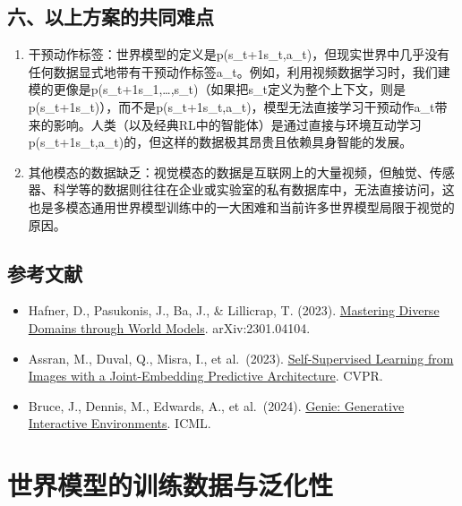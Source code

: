\hypertarget{ux516dux4ee5ux4e0aux65b9ux6848ux7684ux5171ux540cux96beux70b9}{%
\subsection{六、以上方案的共同难点}\label{ux516dux4ee5ux4e0aux65b9ux6848ux7684ux5171ux540cux96beux70b9}}

\begin{enumerate}
\def\labelenumi{\arabic{enumi}.}
\item
  干预动作标签：世界模型的定义是p(s\_t+1\textbar s\_t,a\_t)，但现实世界中几乎没有任何数据显式地带有干预动作标签a\_t。例如，利用视频数据学习时，我们建模的更像是p(s\_t+1\textbar s\_1,\ldots,s\_t)（如果把s\_t定义为整个上下文，则是p(s\_t+1\textbar s\_t)），而不是p(s\_t+1\textbar s\_t,a\_t)，模型无法直接学习干预动作a\_t带来的影响。人类（以及经典RL中的智能体）是通过直接与环境互动学习p(s\_t+1\textbar s\_t,a\_t)的，但这样的数据极其昂贵且依赖具身智能的发展。
\item
  其他模态的数据缺乏：视觉模态的数据是互联网上的大量视频，但触觉、传感器、科学等的数据则往往在企业或实验室的私有数据库中，无法直接访问，这也是多模态通用世界模型训练中的一大困难和当前许多世界模型局限于视觉的原因。
\end{enumerate}

\hypertarget{ux53c2ux8003ux6587ux732e-169}{%
\subsection{参考文献}\label{ux53c2ux8003ux6587ux732e-169}}

\begin{itemize}
\tightlist
\item
  Hafner, D., Pasukonis, J., Ba, J., \& Lillicrap, T. (2023). \href{https://arxiv.org/abs/2301.04104}{Mastering Diverse Domains through World Models}. arXiv:2301.04104.
\item
  Assran, M., Duval, Q., Misra, I., et al.~(2023). \href{https://arxiv.org/abs/2301.08243}{Self-Supervised Learning from Images with a Joint-Embedding Predictive Architecture}. CVPR.
\item
  Bruce, J., Dennis, M., Edwards, A., et al.~(2024). \href{https://arxiv.org/abs/2402.15391}{Genie: Generative Interactive Environments}. ICML.
\end{itemize}

\clearpage

\hypertarget{ux4e16ux754cux6a21ux578bux7684ux8badux7ec3ux6570ux636eux4e0eux6cdbux5316ux6027}{%
\section{世界模型的训练数据与泛化性}\label{ux4e16ux754cux6a21ux578bux7684ux8badux7ec3ux6570ux636eux4e0eux6cdbux5316ux6027}}

